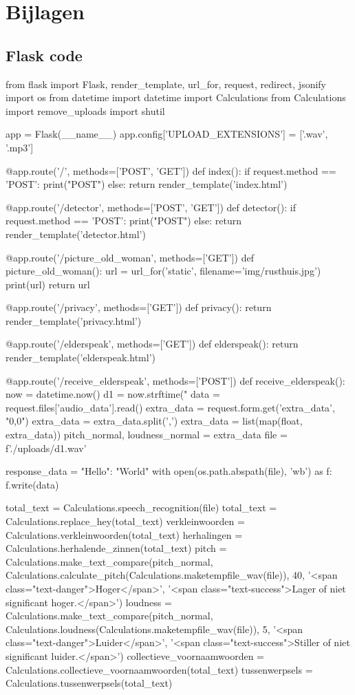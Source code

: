 \chapter{Bijlagen}
\label{ch:bijlagen}

\section{Flask code}
\label{bijlage:flask}
\begin{python}
from flask import Flask, render_template, url_for, request, redirect, jsonify
import os
from datetime import datetime
import Calculations
from Calculations import remove_uploads
import shutil

app = Flask(__name__)
app.config['UPLOAD_EXTENSIONS'] = ['.wav', '.mp3']


@app.route('/', methods=['POST', 'GET'])
def index():
   if request.method == 'POST':
        print("POST")
   else:
        return render_template('index.html')


@app.route('/detector', methods=['POST', 'GET'])
def detector():
   if request.method == 'POST':
        print("POST")
   else:
        return render_template('detector.html')


@app.route('/picture_old_woman', methods=['GET'])
def picture_old_woman():
   url = url_for('static', filename='img/rusthuis.jpg')
   print(url)
   return url


@app.route('/privacy', methods=['GET'])
def privacy():
    return render_template('privacy.html')


@app.route('/elderspeak', methods=['GET'])
def elderspeak():
    return render_template('elderspeak.html')


@app.route('/receive_elderspeak', methods=['POST'])
def receive_elderspeak():
   now = datetime.now()
   d1 = now.strftime("%
   data = request.files['audio_data'].read()
   extra_data = request.form.get('extra_data', "0,0")
   extra_data = extra_data.split(',')
   extra_data = list(map(float, extra_data))
   pitch_normal, loudness_normal = extra_data
   file = f'./uploads/{d1}.wav'

   response_data = {"Hello": "World"}
   with open(os.path.abspath(file), 'wb') as f:
   f.write(data)

   total_text = Calculations.speech_recognition(file)
   total_text = Calculations.replace_hey(total_text)
   verkleinwoorden = Calculations.verkleinwoorden(total_text)
   herhalingen = Calculations.herhalende_zinnen(total_text)
   pitch = Calculations.make_text_compare(pitch_normal,
   Calculations.calculate_pitch(Calculations.maketempfile_wav(file)),
        40,
       '<span class="text-danger">Hoger</span>',
       '<span class="text-success">Lager of niet significant hoger.</span>')
   loudness = Calculations.make_text_compare(pitch_normal,
       Calculations.loudness(Calculations.maketempfile_wav(file)),
       5,
       '<span class="text-danger">Luider</span>',
       '<span class="text-success">Stiller of niet significant luider.</span>')
   collectieve_voornaamwoorden = Calculations.collectieve_voornaamwoorden(total_text)
   tussenwerpsels = Calculations.tussenwerpsels(total_text)


\end{python}
